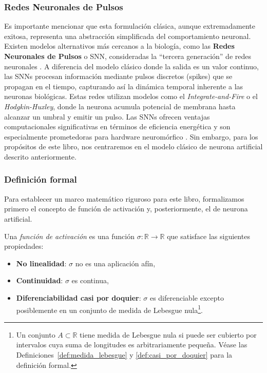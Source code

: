 \subsubsection{Redes Neuronales de Pulsos}

Es importante mencionar que esta formulación clásica, aunque extremadamente exitosa, representa una abstracción simplificada del comportamiento neuronal. Existen modelos alternativos más cercanos a la biología, como las \textbf{Redes Neuronales de Pulsos} o \gls{SNN}, consideradas la ``tercera generación'' de redes neuronales \citep{Maass1997spiking}. A diferencia del modelo clásico donde la salida es un valor continuo, las \glspl{SNN} procesan información mediante pulsos discretos (spikes) que se propagan en el tiempo, capturando así la dinámica temporal inherente a las neuronas biológicas. Estas redes utilizan modelos como el \textit{Integrate-and-Fire} o el \textit{Hodgkin-Huxley}, donde la neurona acumula potencial de membrana hasta alcanzar un umbral y emitir un pulso. Las \glspl{SNN} ofrecen ventajas computacionales significativas en términos de eficiencia energética y son especialmente prometedoras para hardware neuromórfico \citep{Tavanaei2018deep}. Sin embargo, para los propósitos de este libro, nos centraremos en el modelo clásico de neurona artificial descrito anteriormente.

\subsubsection{Definición formal}

Para establecer un marco matemático riguroso para este libro, formalizamos primero el concepto de función de activación y, posteriormente, el de neurona artificial.

\begin{definition}\label{def:funcion_activacion}
	Una \textit{función de activación} es una función $\sigma: \mathbb{R} \to \mathbb{R}$ que satisface las siguientes propiedades:
	\begin{itemize}
		\item \textbf{No linealidad}: $\sigma$ no es una aplicación afín,
		\item \textbf{Continuidad}: $\sigma$ es continua,
		\item \textbf{Diferenciabilidad casi por doquier}: $\sigma$ es diferenciable excepto posiblemente en un conjunto de medida de Lebesgue nula\footnote{Un conjunto $A \subset \mathbb{R}$ tiene medida de Lebesgue nula si puede ser cubierto por intervalos cuya suma de longitudes es arbitrariamente pequeña. Véase las Definiciones~\ref{def:medida_lebesgue} y \ref{def:casi_por_doquier} para la definición formal.}.
	\end{itemize}
\end{definition}

